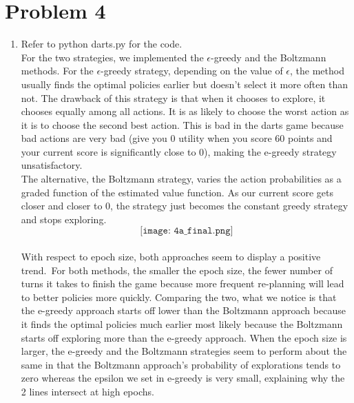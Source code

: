\documentclass[12pt,letterpaper]{article}
\begin{document}
\section*{Problem 4}
\begin{enumerate}[label={(\alph*) }]
        \item Refer to python darts.py for the code. \medskip \\
        For the two strategies, we implemented the $\epsilon$-greedy  and the Boltzmann methods. For the $\epsilon$-greedy strategy, depending on the value of $\epsilon$, the method usually finds the optimal policies earlier but doesn't select it more often than not. The drawback of this strategy is that when it chooses to explore, it chooses equally among all actions. It is as likely to choose the worst action as it is to choose the second best action. This is bad in the darts game because bad actions are very bad (give you 0 utility when you score 60 points and your current score is significantly close to 0), making the e-greedy strategy unsatisfactory. \medskip \\
The alternative, the Boltzmann strategy, varies the action probabilities as a graded function of the estimated value function. As our current score gets closer and closer to 0, the strategy just becomes the constant greedy strategy and stops exploring.  \\
\[ \texttt{[image: 4a\_final.png]} \]\\
        With respect to epoch size, both approaches seem to display a positive trend.\ For both methods, the smaller the epoch size, the fewer number of turns it takes to finish the game because  more frequent re-planning will lead to better policies more quickly. Comparing the two, what we notice is that the e-greedy approach starts off lower than the Boltzmann approach because it finds the optimal policies much earlier most likely because the Boltzmann starts off exploring more than the e-greedy approach. When the epoch size is larger, the e-greedy and the Boltzmann strategies  seem to perform about the same in that the Boltzmann approach's probability of explorations tends to zero whereas the epsilon we set in e-greedy is very small, explaining why the 2 lines intersect at high epochs.         


\end{enumerate}
\end{document}
